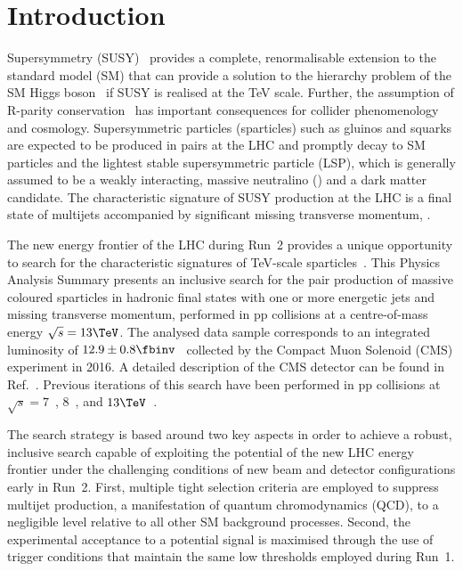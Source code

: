 \section{Introduction}
\label{sec:introduction}

Supersymmetry (SUSY)~\cite{ref:SUSY-1, ref:SUSY0, ref:SUSY1,
  ref:SUSY2, ref:SUSY3, ref:SUSY4, ref:hierarchy1, ref:hierarchy2}
provides a complete, renormalisable extension to the standard model
(SM) that can provide a solution to the hierarchy problem of the SM
Higgs boson~\cite{ref:atlashiggsdiscovery, ref:cmshiggsdiscovery} if
SUSY is realised at the TeV scale. Further, the assumption of R-parity
conservation~\cite{Farrar:1978xj} has important consequences for
collider phenomenology and cosmology. Supersymmetric particles
(sparticles) such as gluinos and squarks are expected to be produced
in pairs at the LHC and promptly decay to SM particles and the
lightest stable supersymmetric particle (LSP), which is generally
assumed to be a weakly interacting, massive neutralino (\chiz) and a
dark matter candidate. The characteristic signature of SUSY production
at the LHC is a final state of multijets accompanied by significant
missing transverse momentum, \ptvecmiss.

The new energy frontier of the LHC during Run~2 provides a unique
opportunity to search for the characteristic signatures of TeV-scale
sparticles~\cite{atlas-12, atlas-13, cms-12, cms-13}. This Physics
Analysis Summary presents an inclusive search for the pair production
of massive coloured sparticles in hadronic final states with one or
more energetic jets and missing transverse momentum, performed in pp
collisions at a centre-of-mass energy $\sqrt{s} = 13\TeV$. The
analysed data sample corresponds to an integrated luminosity of $12.9
\pm 0.8 \fbinv$~\cite{lumi} collected by the Compact Muon Solenoid
(CMS) experiment in 2016. A detailed description of the CMS detector
can be found in Ref.~\cite{ref:CMS}. Previous iterations of this
search have been performed in pp collisions at $\sqrt{s} =
7$~\cite{RA1Paper, RA1Paper2011, RA1Paper2011FULL},
$8$~\cite{RA1Paper2012, RA1Parked}, and $13\TeV$~\cite{RA1Paper2015}.

The search strategy is based around two key aspects in order to
achieve a robust, inclusive search capable of exploiting the potential
of the new LHC energy frontier under the challenging conditions of new
beam and detector configurations early in Run~2. First, multiple tight
selection criteria are employed to suppress multijet production, a
manifestation of quantum chromodynamics (QCD), to a negligible level
relative to all other SM background processes. Second, the
experimental acceptance to a potential signal is maximised through the
use of trigger conditions that maintain the same low thresholds
employed during Run~1.

